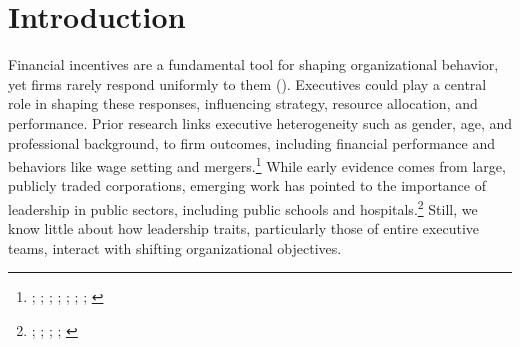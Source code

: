 \documentclass[12pt]{article}
\begin{document}
\begin{abstract}
{         %
		} 
	\end{abstract}
	
	
	
	
	

	
	\onehalfspacing
	
	\newpage

    \section{Introduction}

    Financial incentives are a fundamental tool for shaping organizational behavior, yet firms rarely respond uniformly to them (\cite{cala2022financial}). Executives could play a central role in shaping these responses, influencing strategy, resource allocation, and performance. Prior research links executive heterogeneity such as gender, age, and professional background, to firm outcomes, including financial performance and behaviors like wage setting and mergers.\footnote{\cite{bertrand2003managing}; \cite{matsa2011chipping}; \cite{adams2009women}; \cite{ahern2012changing}; \cite{flabbi2019female}; \cite{benmelech2015military}; \cite{custodio2013generalists}; \cite{frydman2019rising}} While early evidence comes from large, publicly traded corporations, emerging work has pointed to the importance of leadership in public sectors, including public schools and hospitals.\footnote{\cite{best2023individuals}; \cite{bertrand2020glittering}; \cite{choudhury2020managers}; \cite{fenizia2022managers}; \cite{lavy2023effects}} Still, we know little about how leadership traits, particularly those of entire executive teams, interact with shifting organizational objectives.
\end{document}
